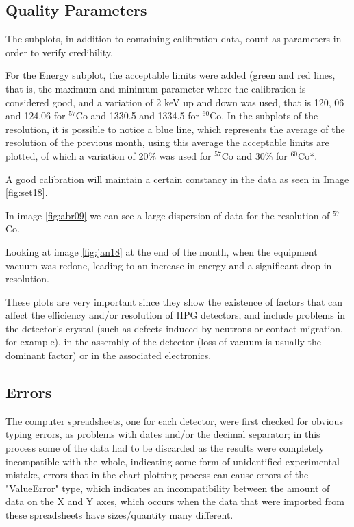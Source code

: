 \documentclass[fleqn,usenatbib]{rasti}
\begin{document}
\subsection{Quality Parameters}
\label{sec:qualityparameters} 
The subplots, in addition to containing calibration data, count as parameters in order to verify credibility.

For the Energy subplot, the acceptable limits were added (green and red lines, that is, the maximum and minimum parameter where the calibration is considered good, and a variation of 2 keV up and down was used, that is 120, 06 and 124.06 for $^{57}$Co and 1330.5 and 1334.5 for $^{60}$Co.
In the subplots of the resolution, it is possible to notice a blue line, which represents the average of the resolution of the previous month, using this average the acceptable limits are plotted, of which a variation of 20\% was used for $^{57}$Co and 30\% for $^{60}$Co*.

A good calibration will maintain a certain constancy in the data as seen in Image \ref{fig:set18}.

In image \ref{fig:abr09} we can see a large dispersion of data for the resolution of $^{57}$Co.

Looking at image \ref{fig:jan18} at the end of the month, when the equipment vacuum was redone, leading to an increase in energy and a significant drop in resolution.

These plots are very important since they show the existence of factors that can affect the efficiency and/or resolution of HPG detectors, and include problems in the detector's crystal (such as defects induced by neutrons or contact migration, for example), in the assembly of the detector (loss of vacuum is usually the dominant factor) or in the associated electronics\citep{knoll2010radiation}.
\\
\subsection{Errors}
\label{sec:erros} 
The computer spreadsheets, one for each detector, were first checked for obvious typing errors, as problems with dates and/or the decimal separator; in this process some of the data had to be discarded as the results were completely incompatible with the whole, indicating some form of unidentified experimental mistake\citep{zahn2017long}, errors that in the chart plotting process can cause errors of the "ValueError" type, which indicates an incompatibility between the amount of data on the X and Y axes, which occurs when the data that were imported from these spreadsheets have sizes/quantity many different.
\end{document}
